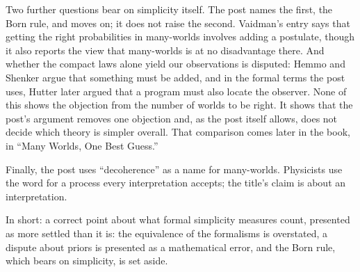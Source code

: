 \begin{afterword}
Two further questions bear on simplicity itself. The post names the first, the Born rule, and moves on; it does not raise the second. Vaidman's entry says that getting the right probabilities in many-worlds involves adding a postulate, though it also reports the view that many-worlds is at no disadvantage there. And whether the compact laws alone yield our observations is disputed: Hemmo and Shenker argue that something must be added, and in the formal terms the post uses, Hutter later argued that a program must also locate the observer. None of this shows the objection from the number of worlds to be right. It shows that the post's argument removes one objection and, as the post itself allows, does not decide which theory is simpler overall. That comparison comes later in the book, in ``Many Worlds, One Best Guess.''

Finally, the post uses ``decoherence'' as a name for many-worlds. Physicists use the word for a process every interpretation accepts; the title's claim is about an interpretation.

In short: a correct point about what formal simplicity measures count, presented as more settled than it is: the equivalence of the formalisms is overstated, a dispute about priors is presented as a mathematical error, and the Born rule, which bears on simplicity, is set aside.
\end{afterword}
